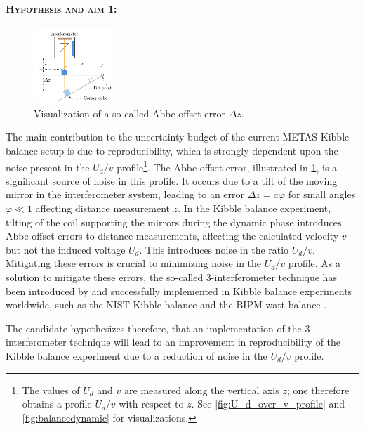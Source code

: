 \documentclass{article}
\begin{document}
\paragraph*{\normalfont \textsc{Hypothesis and aim 1:}}
\begin{figure}
	\centering
	\includegraphics[width=0.27\textwidth]{figures/abbeerror.pdf}
	\caption{Visualization of a so-called Abbe offset error $\Delta z$.}
	\label{fig:abbeerror}
\end{figure}
The main contribution to the uncertainty budget of the current METAS Kibble balance setup is due to reproducibility, which is strongly dependent upon the noise present in the $U_d/v$ profile\footnote{The values of $U_d$ and $v$ are measured along the vertical axis $z$; one therefore obtains a profile $U_d/v$ with respect to $z$. See \cref{fig:U_d_over_v_profile} and \cref{fig:balancedynamic} for visualizations.}. 
The Abbe offset error, illustrated in \cref{fig:abbeerror}, is a significant source of noise in this profile. It occurs due to a tilt of the moving mirror in the interferometer system, leading to an error $\Delta z = a \varphi$ for small angles $\varphi \ll 1$ affecting distance measurement $z$. In the Kibble balance experiment, tilting of the coil supporting the mirrors during the dynamic phase introduces Abbe offset errors to distance measurements, affecting the calculated velocity $v$ but not the induced voltage $U_d$. This introduces noise in the ratio $U_d/v$. Mitigating these errors is crucial to minimizing noise in the $U_d/v$ profile. As a solution to mitigate these errors, the so-called 3-interferometer technique has been introduced by \cite{5544638} and successfully implemented in Kibble balance experiments worldwide, such as the NIST Kibble balance \cite{Haddad_2017} and the BIPM watt balance \cite{Fang_2020}.

The candidate hypothesizes therefore, that an implementation of the 3-interferometer technique will lead to an improvement in reproducibility of the Kibble balance experiment due to a reduction of noise in the $U_d/v$ profile.
\end{document}
